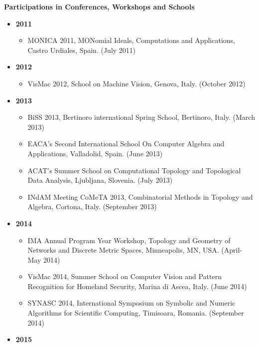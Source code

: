 \documentclass[11pt]{article}
\begin{document}
\vspace*{2.5ex}
\noindent
{\Large\bf Participations in Conferences, Workshops and Schools}
\vspace*{0.5ex}
\begin{itemize}
\item[ ]{\bf 2011}
\begin{itemize}
\item{MONICA 2011, MONomial Ideals, Computations and Applications, Castro Urdiales, Spain. (July 2011)}
\end{itemize}
\vspace*{0.2ex}
\item[ ]{\bf 2012}
\begin{itemize}
\item{VisMac 2012, School on Machine Vision, Genova, Italy. (October 2012)}
\end{itemize}
\vspace*{0.2ex}
\item[ ]{\bf 2013}
\begin{itemize}
\item{BiSS 2013, Bertinoro international Spring School, Bertinoro, Italy. (March 2013)}
\item{EACA's Second International School On Computer Algebra and Applications, Valladolid, Spain. (June 2013)}
\item{ACAT's Summer School on Computational Topology and Topological Data Analysis, Ljubljana, Slovenia. (July 2013)}
\item{INdAM Meeting CoMeTA 2013, Combinatorial Methods in Topology and Algebra, Cortona, Italy. (September 2013)}
\end{itemize}
\vspace*{0.2ex}
\item[ ]{\bf 2014}
\begin{itemize}
\item{IMA Annual Program Year Workshop, Topology and Geometry of Networks and Discrete Metric Spaces, Minneapolis, MN, USA. (April-May 2014)}
\item{VisMac 2014, Summer School on Computer Vision and Pattern Recognition for Homeland Security, Marina di Ascea, Italy. (June 2014)}
\item{SYNASC 2014, International Symposium on Symbolic and Numeric Algorithms for Scientific Computing, Timisoara, Romania. (September 2014)}
\end{itemize}
\vspace*{0.2ex}
\item[ ]{\bf 2015}
\begin{itemize}

\end{itemize}
\end{itemize}
\end{document}
